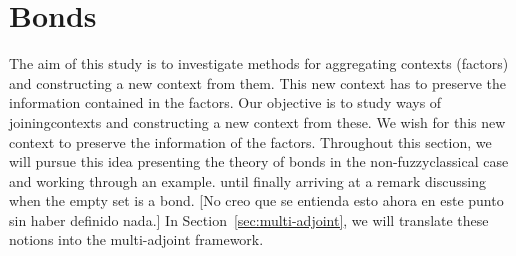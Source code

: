 \documentclass[runningheads,a4paper]{llncs}
\newcommand{\K}{\mathbb{K}}
\newcommand{\calC}{\mathcal C}
\newcommand{\editornote}[1]{{\color{red}[#1]}}
\newcommand{\cred}[1]{{\color{red} #1}}
\newcommand{\cb}[1]{{\color{blue}#1}}
\begin{document}


	



	


\section{Bonds}\label{sec:bonds}

\cb{The aim of this study is to investigate methods for aggregating contexts (factors) and constructing a new context from them. This new context has to preserve the information contained in the factors.}
\cred{Our objective is to study ways of {joining}contexts and constructing a new context from these. We wish for this new context to preserve the information of the factors.} Throughout this section, we will pursue this idea presenting the theory of bonds in the \cred{non-fuzzy}\cb{classical} case and working through an example. \cred{until finally arriving at a remark discussing when the empty set is a bond.} \editornote{No creo que se entienda esto ahora en este punto sin haber definido nada.} In Section~\ref{sec:multi-adjoint}, we will translate these notions into the multi-adjoint framework.
\end{document}
